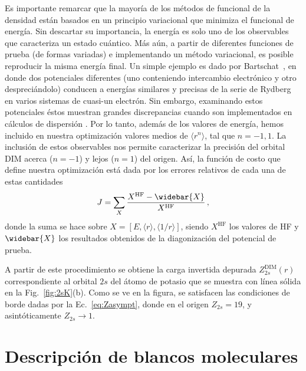 Es importante remarcar que la mayoría de los métodos de funcional de la 
densidad están basados en un principio variacional que minimiza el 
funcional de energía. Sin descartar su importancia, la energía es solo
uno de los observables que caracteriza un estado cuántico. Más aún, a 
partir de diferentes funciones de prueba (de formas variadas) e 
implementando un método variacional, es posible reproducir la misma 
energía final. Un simple ejemplo es dado por 
Bartschat~\cite{Albright:93,Bartschat:96}, en donde dos potenciales
diferentes (uno conteniendo intercambio electrónico y otro 
despreciándolo) conducen a energías similares y precisas de la serie de 
Rydberg en varios sistemas de cuasi-un electrón. Sin embargo, examinando 
estos potenciales éstos muestran grandes discrepancias cuando son 
implementados en cálculos de dispersión \cite{BartschatBray:96}. Por lo 
tanto, además de los valores de energía, hemos incluido en nuestra 
optimización valores medios de $\langle r^{n} \rangle$, tal que 
$n=-1,1$. La inclusión de estos observables nos permite caracterizar la 
precisión del orbital DIM acerca ($n=-1$) y lejos ($n=1$) del origen. 
Así, la función de costo que define nuestra optimización está dada por 
los errores relativos de cada una de estas cantidades
\begin{equation}
J=\sum_X \frac{X^{\mathrm{HF}}-\widebar{X}}{X^{\mathrm{HF}}}\,,
\label{eq:fncosto-dim}
\end{equation}
donde la suma se hace sobre 
$X=\left[E,\langle r \rangle,\langle 1/r \rangle\right]$, siendo 
$X^{\mathrm{HF}}$ los valores de HF y $\widebar{X}$ los resultados 
obtenidos de la diagonización del potencial de prueba. 

A partir de este procedimiento se obtiene la carga invertida depurada 
$Z_{2s}^{\mathrm{DIM}}(r)$ correspondiente al orbital $2s$ del átomo 
de potasio que se muestra con línea sólida en la Fig.~\ref{fig:2sK}(b).
Como se ve en la figura, se satisfacen las condiciones de borde dadas 
por la Ec.~\ref{eq:Zasympt}, donde en el origen $Z_{2s} = 19$, y 
asintóticamente $Z_{2s} \rightarrow 1$.

\section{Descripción de blancos moleculares}
\label{sec:moleculas}

